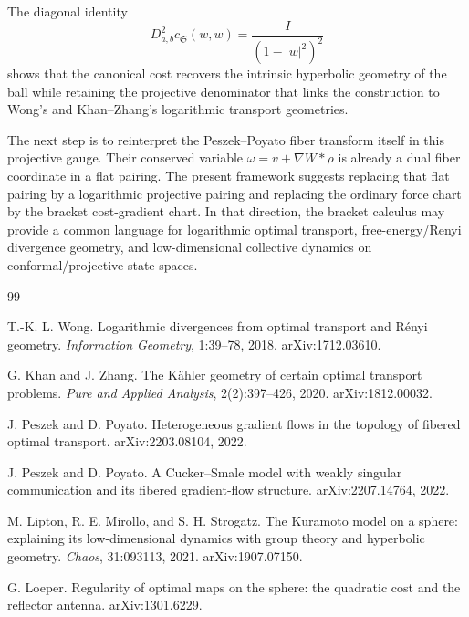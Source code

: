 \documentclass[11pt]{article}
\newcommand{\norm}[1]{\left|#1\right|}
\newcommand{\cs}{c_{\mathfrak S}}
\newcommand{\grad}{\nabla}
\begin{document}
The diagonal identity
\[
    D^2_{a,b}\cs(w,w)=\frac{I}{(1-\norm w^2)^2}
\]
shows that the canonical cost recovers the intrinsic hyperbolic geometry of the ball while retaining the projective denominator that links the construction to Wong's and Khan--Zhang's logarithmic transport geometries.

The next step is to reinterpret the Peszek--Poyato fiber transform itself in this projective gauge.  Their conserved variable $\omega=v+\grad W*\rho$ is already a dual fiber coordinate in a flat pairing.  The present framework suggests replacing that flat pairing by a logarithmic projective pairing and replacing the ordinary force chart by the bracket cost-gradient chart.  In that direction, the bracket calculus may provide a common language for logarithmic optimal transport, free-energy/Renyi divergence geometry, and low-dimensional collective dynamics on conformal/projective state spaces.

\begin{thebibliography}{99}

T.-K. L. Wong.
\newblock Logarithmic divergences from optimal transport and R\'enyi geometry.
\newblock \emph{Information Geometry}, 1:39--78, 2018.
\newblock arXiv:1712.03610.

G. Khan and J. Zhang.
\newblock The K\"ahler geometry of certain optimal transport problems.
\newblock \emph{Pure and Applied Analysis}, 2(2):397--426, 2020.
\newblock arXiv:1812.00032.

J. Peszek and D. Poyato.
\newblock Heterogeneous gradient flows in the topology of fibered optimal transport.
\newblock arXiv:2203.08104, 2022.

J. Peszek and D. Poyato.
\newblock A Cucker--Smale model with weakly singular communication and its fibered gradient-flow structure.
\newblock arXiv:2207.14764, 2022.

M. Lipton, R. E. Mirollo, and S. H. Strogatz.
\newblock The Kuramoto model on a sphere: explaining its low-dimensional dynamics with group theory and hyperbolic geometry.
\newblock \emph{Chaos}, 31:093113, 2021.
\newblock arXiv:1907.07150.

G. Loeper.
\newblock Regularity of optimal maps on the sphere: the quadratic cost and the reflector antenna.
\newblock arXiv:1301.6229.

\end{thebibliography}
\end{document}
